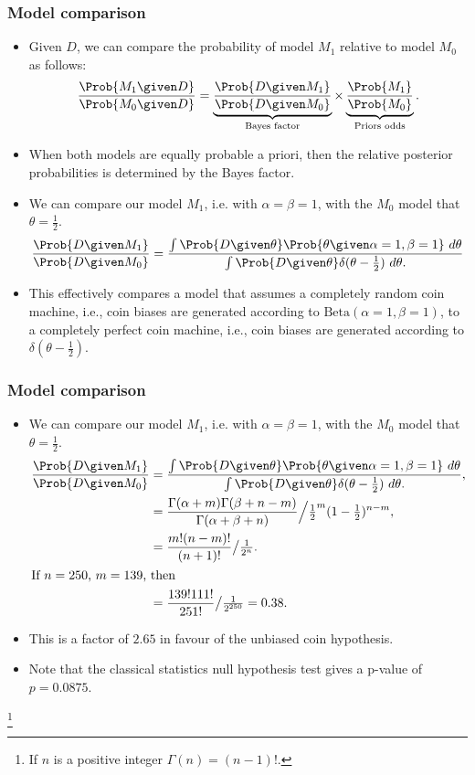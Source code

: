 \documentclass{slides}
\begin{document}
\begin{frame}
	\frametitle{Model comparison}
	\begin{itemize}
		\item Given $D$, we can compare the probability of model $M_1$ relative to model $M_0$ as follows:
			\begin{align*}
				\frac{\Prob{M_1\given D}}{\Prob{M_0\given D}} = 
				\underbrace{\frac{\Prob{D\given M_1}}{\Prob{D\given M_0}}}_{\text{Bayes factor}} \times
				\underbrace{\frac{\Prob{M_1}}{\Prob{M_0}}}_{\text{Priors odds}}. 
			\end{align*}
		\item When both models are equally probable a priori, then the relative posterior probabilities is determined by the Bayes factor.
		\item We can compare our model $M_1$, i.e. with $\alpha = \beta = 1$, with the $M_0$ model that $\theta = \frac{1}{2}$.
			\begin{align*}
				\frac{\Prob{D\given M_1}}{\Prob{D\given M_0}} = \frac{
				\int\Prob{D\given\theta}\Prob{\theta\given\alpha=1,\beta=1}\ d\theta 
				}{
					\int\Prob{D\given\theta} \delta(\theta-\frac{1}{2})\ d\theta.
				}
			\end{align*}

		\item This effectively compares a model that assumes a
			completely random coin machine, i.e., coin biases are
			generated according to $\textrm{Beta}(\alpha=1,
			\beta=1)$, to a completely perfect coin machine, i.e.,
			coin biases are generated according to
			$\delta(\theta-\frac{1}{2})$.  \end{itemize}

	\end{frame} 
\begin{frame}
	\frametitle{Model comparison}
	\begin{itemize}
		\item We can compare our model $M_1$, i.e. with $\alpha = \beta = 1$, with the $M_0$ model that $\theta = \frac{1}{2}$.
			\begin{align*}
				\frac{\Prob{D\given M_1}}{\Prob{D\given M_0}} &= \frac{
				\int\Prob{D\given\theta}\Prob{\theta\given\alpha=1,\beta=1}\ d\theta 
				}{
					\int\Prob{D\given\theta} \delta(\theta-\frac{1}{2})\ d\theta.
				},\\
				&= \frac{\Gamma(\alpha+m)\Gamma(\beta+n-m)}{\Gamma(\alpha+\beta+n)} \Big/ \tfrac{1}{2}^m (1-\tfrac{1}{2})^{n-m},\\
				&= \frac{m!(n-m)!}{(n+1)!} \big/ \tfrac{1}{2^n}.\\
				\intertext{If $n=250$, $m=139$, then}
				&= \frac{139!111!}{251!} \big/ \tfrac{1}{2^{250}} = 0.38.
			\end{align*}
		\item This is a factor of $2.65$ in favour of the unbiased coin hypothesis.
		\item Note that the classical statistics null hypothesis test gives a p-value of $p=0.0875$.
	\end{itemize}
	\let\thefootnote\relax\footnote{If $n$ is a positive integer $\Gamma(n) = (n-1)!$.}
	\end{frame}
\end{document}

